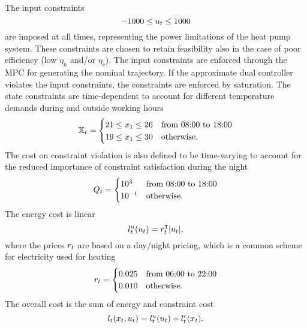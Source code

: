The input constraints
\begin{equation}
  -1000 \leq u_t \leq 1000
\end{equation}
are imposed at all times, representing the power limitations of the heat pump
system. These constraints are chosen to retain feasibility also in the case of
poor efficiency (low $\eta_h$ and/or $\eta_c$). The input constraints are
enforced through the MPC for generating the nominal trajectory. If the
approximate dual controller violates the input constraints, the constraints are
enforced by saturation. The state constraints are time-dependent to account for
different temperature demands during and outside working hours
\begin{subequations}
\begin{equation}
  \mathbb{X}_t = \begin{cases} 21 \leq x_1 \leq 26 & \text{from 08:00 to 18:00} \\
                 19 \leq x_1 \leq 30 & \text{otherwise}.
           \end{cases}
\end{equation}
\end{subequations}
The cost on constraint violation is also defined to be time-varying to account
for the reduced importance of constraint satisfaction during the night
\begin{equation}
   Q_t = \begin{cases} 10^3 & \text{from 08:00 to 18:00} \\
                       10^{-1} & \text{otherwise}.
           \end{cases}
\end{equation}
The energy cost is linear
\begin{equation}
  l^u_t(u_t) = r_t^{\intercal} |u_t|,
\end{equation}
where the prices $r_t$ are based on a day/night pricing, which is a common
scheme for electricity used for heating
\begin{equation}
   r_t = \begin{cases} 0.025  & \text{from 06:00 to 22:00} \\
                     0.010  & \text{otherwise}.
           \end{cases}
\end{equation}
The overall cost is the sum of energy and constraint cost
\begin{equation}
  l_t(x_t,u_t) = l^u_t(u_t) + l^\text{c}_t(x_t).
\end{equation}

